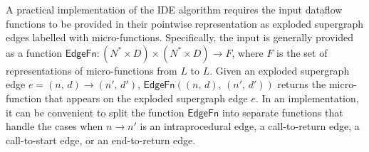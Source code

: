 A practical implementation of the IDE algorithm requires
the input dataflow functions to be provided in their pointwise representation
as exploded supergraph edges labelled with micro-functions.
Specifically,
the input is generally provided as a function $\textsf{EdgeFn}: (N^* \times D) \times (N^* \times D) \to F$,
where $F$ is the set of representations of micro-functions from $L$ to $L$.
Given an exploded supergraph edge $e=(n,\,d) \to (n',\,d')$,
$\textsf{EdgeFn}((n,\,d),\,(n',\,d'))$ returns the micro-function that appears on the exploded supergraph edge $e$.
In an implementation, it can be convenient to split the function $\textsf{EdgeFn}$ into separate functions that handle the cases when $n\to n'$ is an intraprocedural edge, a call-to-return edge, a call-to-start edge, or an end-to-return edge.


